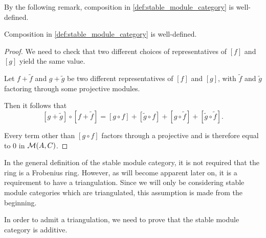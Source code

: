 By the following remark, composition in \autoref{def:stable_module_category} is well-defined.
\begin{remark}
    \label{rem:stmod_composition_well-defined}
    Composition in \autoref{def:stable_module_category} is well-defined.
\end{remark}
\begin{proof}
    We need to check that two different choices of representatives of \( [f] \) and \( [g] \) yield the same value.

    Let \( f + \widetilde{f} \) and \( g + \widetilde{g} \) be two different representatives of \( [f] \) and \( [g] \), with \( \widetilde{f} \) and \( \widetilde{g} \) factoring through some projective modules.

    Then it follows that
    \[
         [g + \widetilde{g}] \circ [f + \widetilde{f}] = [g \circ f] + [\widetilde{g} \circ f] + [g \circ \widetilde{f}] + [\widetilde{g} \circ \widetilde{f}].
    \]
    
    Every term other than \( [g \circ f] \) factors through a projective and is therefore equal to \( 0 \) in \( {\mathcal{M}}(A, C) \).
\end{proof}

In the general definition of the stable module category, it is not required that the ring is a Frobenius ring. However, as will become apparent later on, it is a requirement to have a triangulation. Since we will only be considering stable module categories which are triangulated, this assumption is made from the beginning.

In order to admit a triangulation, we need to prove that the stable module category is additive.

